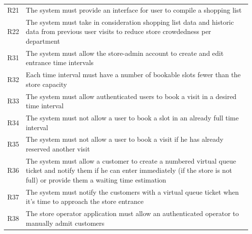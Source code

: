 \begin{tabular}{C{1cm}L{14.1cm}}
    R21   & The system must provide an interface for user to compile a shopping list                                                                                                                    \\
    R22   & The system must take in consideration shopping list data and historic data from previous user visits to reduce store crowdedness per department                                             \\
    R31   & The system must allow the store-admin account to create and edit entrance time intervals                                                                                                    \\
    R32   & Each time interval must have a number of bookable slots fewer than the store capacity                                                                                                       \\
    R33   & The system must allow authenticated users to book a visit in a desired time interval                                                                                                        \\
    R34   & The system must not allow a user to book a slot in an already full time interval                                                                                                            \\
    R35   & The system must not allow a user to book a visit if he has already reserved another visit                                                                                                   \\
    R36   & The system must allow a customer to create a numbered virtual queue ticket and notify them if he can enter immediately (if the store is not full) or provide them a waiting time estimation \\
    R37   & The system must notify the customers with a virtual queue ticket when it's time to approach the store entrance                                                                              \\
    R38   & The store operator application must allow an authenticated operator to manually admit customers                                                                                             \\
\end{tabular}

\vfill

